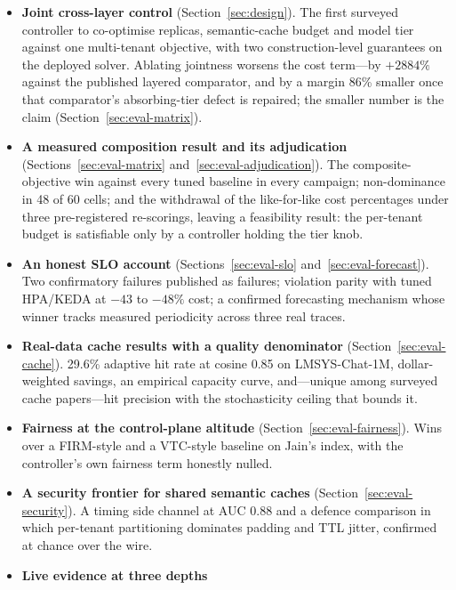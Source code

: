 \begin{itemize}
  \item \textbf{Joint cross-layer control} (Section~\ref{sec:design}). The
        first surveyed controller to co-optimise replicas, semantic-cache
        budget and model tier against one multi-tenant objective, with two
        construction-level guarantees on the deployed solver. Ablating
        jointness worsens the cost term---by $+2884\%$ against the published
        layered comparator, and by a margin 86\% smaller once that
        comparator's absorbing-tier defect is repaired; the smaller number
        is the claim (Section~\ref{sec:eval-matrix}).
  \item \textbf{A measured composition result and its adjudication}
        (Sections~\ref{sec:eval-matrix} and~\ref{sec:eval-adjudication}).
        The composite-objective win against every tuned baseline in every
        campaign; non-dominance in 48 of 60 cells; and the withdrawal of the
        like-for-like cost percentages under three pre-registered
        re-scorings, leaving a feasibility result: the per-tenant budget is
        satisfiable only by a controller holding the tier knob.
  \item \textbf{An honest SLO account} (Sections~\ref{sec:eval-slo}
        and~\ref{sec:eval-forecast}). Two confirmatory failures published as
        failures; violation parity with tuned HPA/KEDA at $-43$ to
        $-48\%$ cost; a confirmed forecasting mechanism whose winner tracks
        measured periodicity across three real traces.
  \item \textbf{Real-data cache results with a quality denominator}
        (Section~\ref{sec:eval-cache}). 29.6\% adaptive hit rate at cosine
        0.85 on LMSYS-Chat-1M, dollar-weighted savings, an empirical
        capacity curve, and---unique among surveyed cache papers---hit
        precision with the stochasticity ceiling that bounds it.
  \item \textbf{Fairness at the control-plane altitude}
        (Section~\ref{sec:eval-fairness}). Wins over a FIRM-style and a
        VTC-style baseline on Jain's index, with the controller's own
        fairness term honestly nulled.
  \item \textbf{A security frontier for shared semantic caches}
        (Section~\ref{sec:eval-security}). A timing side channel at AUC
        0.88 and a defence comparison in which per-tenant partitioning
        dominates padding and TTL jitter, confirmed at chance over the wire.
  \item \textbf{Live evidence at three depths}

\end{itemize}
